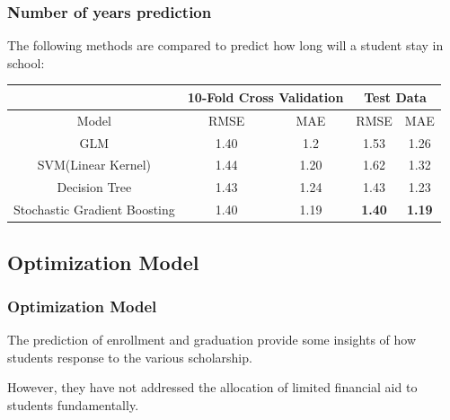 \documentclass{beamer}
\begin{document}
\begin{frame}
\frametitle{Number of years prediction}
The following methods are compared to predict how long will a student stay in school:

\begin{table}[H]
\centering
\scriptsize
\label{num_year}
\begin{tabular}{|c|c|c|c|c|} \hline
    & \multicolumn{2}{c|}{10-Fold Cross Validation} &
\multicolumn{2}{c|}{Test Data} \\ \hline
Model                        & RMSE                  & MAE                   & RMSE           & MAE           \\ \hline
GLM                          & 1.40                  & 1.2                   & 1.53           & 1.26          \\ \hline
SVM(Linear Kernel)           & 1.44                  & 1.20                  & 1.62           & 1.32          \\ \hline
Decision Tree                         & 1.43                  & 1.24        & 1.43           & 1.23          \\ \hline
Stochastic Gradient Boosting & 1.40                  & 1.19                  & \textbf{1.40}           & \textbf{1.19}    \\ 
\hline
\end{tabular}
\end{table}
\end{frame}


\subsection{Optimization Model}
\begin{frame}
\frametitle{Optimization Model}
The prediction of enrollment and graduation provide some 
insights of how students response to the various
scholarship. 

However, they have not addressed the allocation of limited
financial aid to students fundamentally.

\end{frame}
\end{document}
